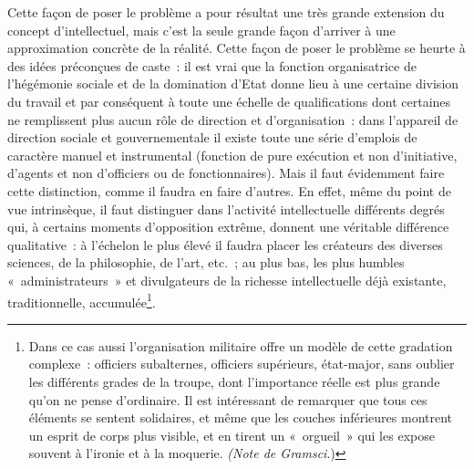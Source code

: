 \documentclass[french,twoside]{book} %
\begin{document}
\noindent Cette façon de poser le problème a pour résultat une très grande extension du concept d’intellectuel, mais c’est la seule grande façon d’arriver à une approximation concrète de la réalité. Cette façon de poser le problème se heurte à des idées préconçues de caste : il est vrai que la fonction organisatrice de l’hégémonie sociale et de la domination d’Etat donne lieu à une certaine division du travail et par conséquent à toute une échelle de qualifications dont certaines ne remplissent plus aucun rôle de direction et d’organisation : dans l’appareil de direction sociale et gouvernementale il existe toute une série d’emplois de caractère manuel et instrumental (fonction de pure exécution et non d’initiative, d’agents et non d’officiers ou de fonctionnaires). Mais il faut évidemment faire cette distinction, comme il faudra en faire d’autres. En effet, même du point de vue intrinsèque, il faut distinguer dans l’activité intellectuelle différents degrés qui, à certains moments d’opposition extrême, donnent une véritable différence qualitative : à l’échelon le plus élevé il faudra placer les créateurs des diverses sciences, de la philosophie, de l’art, etc. ; au plus bas, les plus humbles « administrateurs » et divulgateurs de la richesse intellectuelle déjà existante, traditionnelle, accumulée\footnote{Dans ce cas aussi l’organisation militaire offre un modèle de cette gradation complexe : officiers subalternes, officiers supérieurs, état-major, sans oublier les différents grades de la troupe, dont l’importance réelle est plus grande qu’on ne pense d’ordinaire. Il est intéressant de remarquer que tous ces éléments se sentent solidaires, et même que les couches inférieures montrent un esprit de corps plus visible, et en tirent un « orgueil » qui les expose souvent à l’ironie et à la moquerie. \emph{(Note de Gramsci}.)}.\par
\end{document}
